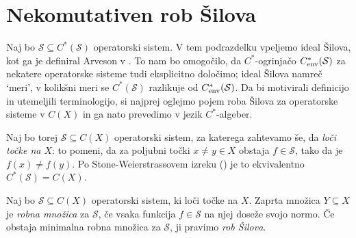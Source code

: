 \section{Nekomutativen rob Šilova}\label{sec:11}

Naj bo $\mathcal{S} \subseteq C^*(\mathcal{S})$ operatorski sistem.
V tem podrazdelku vpeljemo ideal Šilova, kot ga je definiral Arveson v \cite{arveson1969}.
To nam bo omogočilo, da $C^*$-ogrinjačo $C^* _{\operatorname{env}}(\mathcal{S})$ za nekatere operatorske sisteme tudi eksplicitno določimo; ideal Šilova namreč `meri',
v kolikšni meri se $C^*(\mathcal{S})$ razlikuje od $C^* _{\operatorname{env}}(\mathcal{S})$.
Da bi motivirali definicijo in utemeljili terminologijo, si najprej oglejmo pojem roba Šilova za operatorske sisteme v $C(X)$ in ga nato prevedimo v jezik $C^*$-algeber.

Naj bo torej $\mathcal{S} \subseteq C(X)$ operatorski sistem, za katerega zahtevamo še, da \emph{loči točke na $X$}:
to pomeni, da za poljubni točki $x \neq y \in X$ obstaja $f \in \mathcal{S}$, tako da je $f(x) \neq f(y)$.
Po Stone-Weierstrassovem izreku (\cite[Theorem V.8.1., str. 145]{conway1990}) je to ekvivalentno $C^*(\mathcal{S}) = C(X)$.

\begin{definicija}
    Naj bo $\mathcal{S} \subseteq C(X)$ operatorski sistem, ki loči točke na $X$.
    Zaprta množica $Y \subseteq X$ je \emph{robna množica} za $\mathcal{S}$,
    če vsaka funkcija $f \in \mathcal{S}$
    na njej doseže svojo normo.
    Če obstaja minimalna robna množica za $\mathcal{S}$, ji pravimo \emph{rob Šilova}.
\end{definicija}

